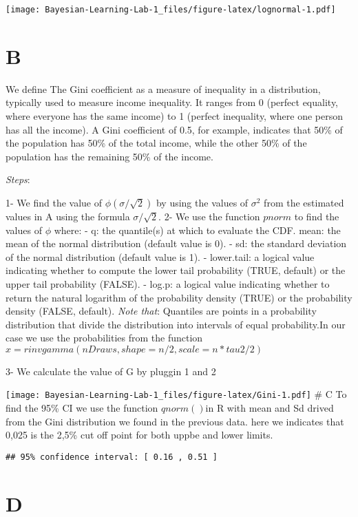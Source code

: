 \documentclass[
]{article}
\begin{document}
\texttt{[image: Bayesian-Learning-Lab-1\_files/figure-latex/lognormal-1.pdf]}

\hypertarget{b-1}{%
\section{B}\label{b-1}}

We define The Gini coefficient as a measure of inequality in a
distribution, typically used to measure income inequality. It ranges
from 0 (perfect equality, where everyone has the same income) to 1
(perfect inequality, where one person has all the income). A Gini
coefficient of 0.5, for example, indicates that 50\% of the population
has 50\% of the total income, while the other 50\% of the population has
the remaining 50\% of the income.

\emph{Steps}:

1- We find the value of \(\phi(\sigma/\sqrt2)\) by using the values of
\(\sigma^2\) from the estimated values in A using the formula
\(\sigma/\sqrt2\). 2- We use the function \(pnorm\) to find the values
of \(\phi\) where: - q: the quantile(s) at which to evaluate the CDF.
mean: the mean of the normal distribution (default value is 0). - sd:
the standard deviation of the normal distribution (default value is 1).
- lower.tail: a logical value indicating whether to compute the lower
tail probability (TRUE, default) or the upper tail probability (FALSE).
- log.p: a logical value indicating whether to return the natural
logarithm of the probability density (TRUE) or the probability density
(FALSE, default). \emph{Note that}: Quantiles are points in a
probability distribution that divide the distribution into intervals of
equal probability.In our case we use the probabilities from the function
\(x=rinvgamma(nDraws, shape=n/2, scale=n*tau2/2)\)

3- We calculate the value of G by pluggin 1 and 2

\texttt{[image: Bayesian-Learning-Lab-1\_files/figure-latex/Gini-1.pdf]}
\# C To find the 95\% CI we use the function \(qnorm()\)in R with mean
and Sd drived from the Gini distribution we found in the previous data.
here we indicates that 0,025 is the 2,5\% cut off point for both uppbe
and lower limits.

\begin{verbatim}
## 95% confidence interval: [ 0.16 , 0.51 ]
\end{verbatim}

\hypertarget{d}{%
\section{D}\label{d}}
\end{document}
